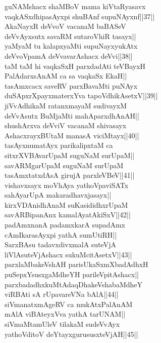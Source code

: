 \documentclass{article}
\begin{document}
guNAMshacx shaMBoV mama kiVtaRyasavx\\
vaqkASxdhipasAyxpi shuBAnf supuNAyxnf||37||\\
AkaNayxR deVvoV vacanaM baBASeV\\
deVvAyxsutx savaRM  sutaroVhiR tasayx||\\
yaMyaM tu kalapxyaMti supuNayxyukAtx\\
deVvoVpamA deVvavarAshacx deVvi||38||\\
taM taM hi vaqkaSxH parxdadAti teVBayxH\\
PalAdarxsAnAM ca sa vaqkaSx EkaH||\\
tasAmxcacx saveRV parxBavaMti puNAyx\\
duSApxrXpayxmaterxYva tapoVdhikAsetxV||39||\\
jiVvAdhikaM ratanxmayaM sudivayxM\\
deVvAsutx BuMjaMti mahAparxdhAnAH||\\
shushArxva deVviV vacanaM shivasayx\\
AshacxrayxBUtaM manasA viciMtayx||40||\\
tasAyxnumatAyx parikalipxtaM ca\\
sitxrXVBAvarUpaM suguNaM surUpaM||\\
savARMgarUpaM suguNaM surUpaM\\
tasAmxtatxdAsA girujA parxleVBeV||41||\\
vishavxsayx moVhAya yathoVpaviSATx\\
sahAyarUpA makaradhavxjasayx||\\
kirxVDAnidhAnaM suKasididhxrUpaM\\
savARBipanAnx kamalAyatAkiSxV||42||\\
padAmxnanA padamxkarA supadAmx\\
cAmIkarasAyxpi yathA sumUtiRH||\\
SarxBAsu tadavxdivxmalA suteVjA\\
liVlAsuteVjAshacx sukuMcitAsetxV||43||\\
parxlaMbakeVshAH parisUkaSxmXbadAdhxH\\
puSepxYsusxgaMdheYH parileVpitAshacx||\\
parxbadadhxkuMtAdaqDhakeVshabaMdheY\\
viRBAti sA rUpavareVNa bAlA||44||\\
siVmanatxmAgeRV ca mukAtxPalAnAM\\
mAlA viBAteyxVva yathA tarUNAM||\\
siVmaMtamUleV tilakaM sudeVvAyx\\
yathoVditoV deYtayxgurususxteVjAH||45||\\
\end{document}
